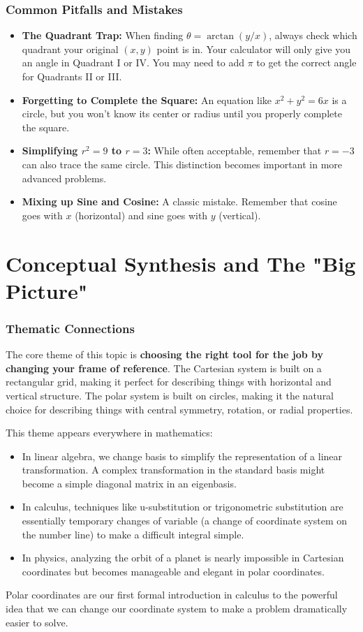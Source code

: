 \documentclass{article}
\begin{document}
\section{Common Pitfalls and Mistakes}
\begin{itemize}
    \item \textbf{The Quadrant Trap:} When finding \(\theta = \arctan(y/x)\), always check which quadrant your original \((x,y)\) point is in. Your calculator will only give you an angle in Quadrant I or IV. You may need to add \(\pi\) to get the correct angle for Quadrants II or III.
    \item \textbf{Forgetting to Complete the Square:} An equation like \(x^2+y^2=6x\) is a circle, but you won't know its center or radius until you properly complete the square.
    \item \textbf{Simplifying \(r^2 = 9\) to \(r = 3\):} While often acceptable, remember that \(r=-3\) can also trace the same circle. This distinction becomes important in more advanced problems.
    \item \textbf{Mixing up Sine and Cosine:} A classic mistake. Remember that cosine goes with \(x\) (horizontal) and sine goes with \(y\) (vertical).
\end{itemize}

\part{Conceptual Synthesis and The "Big Picture"}

\section{Thematic Connections}
The core theme of this topic is \textbf{choosing the right tool for the job by changing your frame of reference}. The Cartesian system is built on a rectangular grid, making it perfect for describing things with horizontal and vertical structure. The polar system is built on circles, making it the natural choice for describing things with central symmetry, rotation, or radial properties.

This theme appears everywhere in mathematics:
\begin{itemize}
    \item In linear algebra, we change basis to simplify the representation of a linear transformation. A complex transformation in the standard basis might become a simple diagonal matrix in an eigenbasis.
    \item In calculus, techniques like u-substitution or trigonometric substitution are essentially temporary changes of variable (a change of coordinate system on the number line) to make a difficult integral simple.
    \item In physics, analyzing the orbit of a planet is nearly impossible in Cartesian coordinates but becomes manageable and elegant in polar coordinates.
\end{itemize}
Polar coordinates are our first formal introduction in calculus to the powerful idea that we can change our coordinate system to make a problem dramatically easier to solve.
\end{document}

